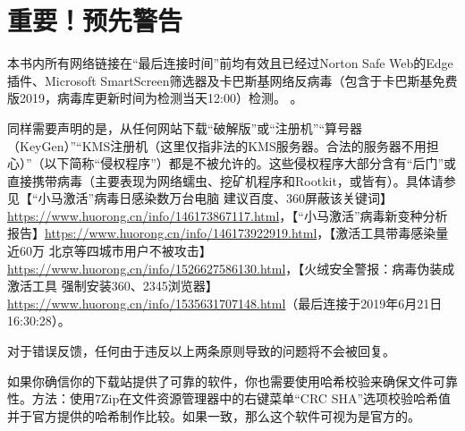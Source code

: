\section{重要！预先警告}
\begin{window}
本书内所有网络链接在“最后连接时间”前均有效且已经过Norton Safe Web的Edge插件、Microsoft SmartScreen筛选器及卡巴斯基网络反病毒（包含于卡巴斯基免费版2019，病毒库更新时间为检测当天12:00）检测。 {}。\par 同样需要声明的是，从任何网站下载“破解版”或“注册机”“算号器（KeyGen）”“KMS注册机（这里仅指非法的KMS服务器。合法的服务器不用担心）”（以下简称“侵权程序”）都是不被允许的。这些侵权程序大部分含有“后门”或直接携带病毒（主要表现为网络蠕虫、挖矿机程序和Rootkit，或皆有）。具体请参见【“小马激活”病毒日感染数万台电脑 建议百度、360屏蔽该关键词】\url{https://www.huorong.cn/info/146173867117.html}，【“小马激活”病毒新变种分析报告】\url{https://www.huorong.cn/info/146173922919.html}，【激活工具带毒感染量近60万 北京等四城市用户不被攻击】\url{https://www.huorong.cn/info/1526627586130.html}，【火绒安全警报：病毒伪装成激活工具  强制安装360、2345浏览器】\url{https://www.huorong.cn/info/1535631707148.html}（最后连接于2019年6月21日16:30:28）。\end{window}\par
对于错误反馈，任何由于违反以上两条原则导致的问题将不会被回复。\par 
如果你确信你的下载站提供了可靠的软件，你也需要使用哈希校验来确保文件可靠性。方法：使用7Zip在文件资源管理器中的右键菜单“CRC SHA”选项校验哈希值并于官方提供的哈希制作比较。如果一致，那么这个软件可视为是官方的。 \par
